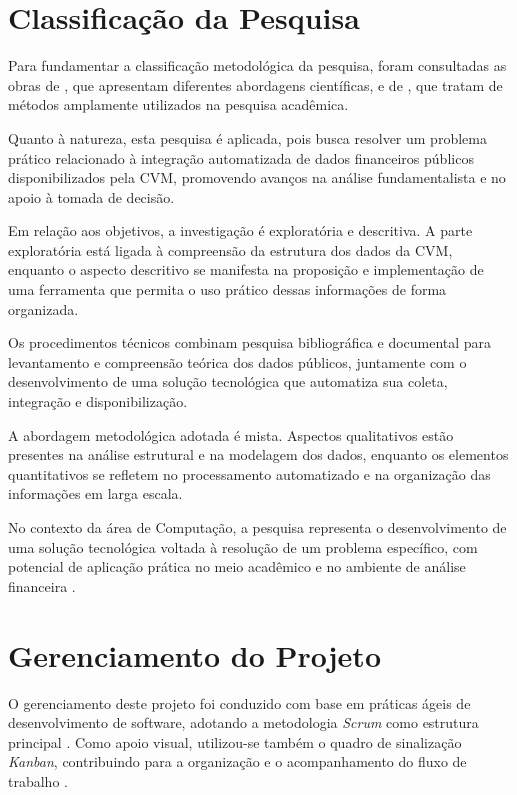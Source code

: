 \documentclass[recuosum=1.5cm]{iftex2024}
\begin{document}
\section{Classificação da Pesquisa} \label{subsec:classificacao}

Para fundamentar a classificação metodológica da pesquisa, foram consultadas as obras de \citet{cervo:1983:metodologia}, que apresentam diferentes abordagens científicas, e de \citet{gerhardt:2009:metodos}, que tratam de métodos amplamente utilizados na pesquisa acadêmica.

Quanto à natureza, esta pesquisa é aplicada, pois busca resolver um problema prático relacionado à integração automatizada de dados financeiros públicos disponibilizados pela CVM, promovendo avanços na análise fundamentalista e no apoio à tomada de decisão.

Em relação aos objetivos, a investigação é exploratória e descritiva. A parte exploratória está ligada à compreensão da estrutura dos dados da CVM, enquanto o aspecto descritivo se manifesta na proposição e implementação de uma ferramenta que permita o uso prático dessas informações de forma organizada.

Os procedimentos técnicos combinam pesquisa bibliográfica e documental para levantamento e compreensão teórica dos dados públicos, juntamente com o desenvolvimento de uma solução tecnológica que automatiza sua coleta, integração e disponibilização.

A abordagem metodológica adotada é mista. Aspectos qualitativos estão presentes na análise estrutural e na modelagem dos dados, enquanto os elementos quantitativos se refletem no processamento automatizado e na organização das informações em larga escala.

No contexto da área de Computação, a pesquisa representa o desenvolvimento de uma solução tecnológica voltada à resolução de um problema específico, com potencial de aplicação prática no meio acadêmico e no ambiente de análise financeira \cite{wazlawick:2009:metodo}.


\section{Gerenciamento do Projeto} \label{subsec:metodologia}

O gerenciamento deste projeto foi conduzido com base em práticas ágeis de desenvolvimento de software, adotando a metodologia \textit{Scrum} como estrutura principal \cite{schwaber:2004:agile}. Como apoio visual, utilizou-se também o quadro de sinalização \textit{Kanban}, contribuindo para a organização e o acompanhamento do fluxo de trabalho \cite{anderson:2010:kanban}.
\end{document}
